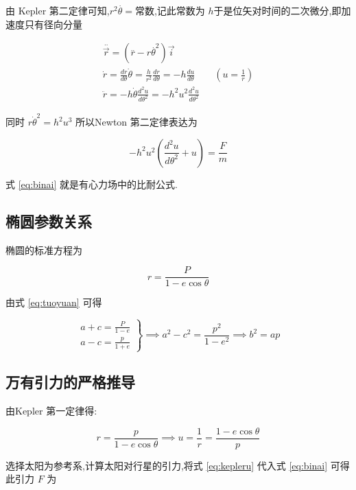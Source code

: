 由 Kepler 第二定律可知,$r^2\overset{.}{\theta}=\mbox{常数}$,记此常数为 $h$于是位矢对时间的二次微分,即加速度只有径向分量

\begin{gather}
  \overset{..}{\overrightarrow{r}}=(\overset{..}{r}-r\overset{.}{\theta}^2)\vec{i}
  \label{eq:rdd}\\
  \dot r =\frac{dr}{d\theta}\dot \theta =\frac{h}{r^2}\frac{dr}{d\theta}=-h\frac{du}{d\theta} \qquad (u=\frac{1}{r})\\
  \ddot r =-h\dot \theta \frac{d^2u}{d\theta^2}=-h^2u^2\frac{d^2u}{d\theta^2} 
\end{gather}

同时 $r{\dot \theta}^2=h^2u^3$ 所以Newton 第二定律表达为

\begin{equation}
  -h^2u^2(\frac{d^2u}{d\theta^2}+u)=\frac{F}{m}
  \label{eq:binai}
\end{equation}

式 \eqref{eq:binai} 就是有心力场中的比耐公式.

\subsection{椭圆参数关系}

椭圆的标准方程为

\begin{equation}
  r=\frac{P}{1-e\cos\theta}
  \label{eq:tuoyuan}
\end{equation}

由式 \eqref{eq:tuoyuan} 可得

\[ \left.
\begin{gathered}
  a+c=\frac{P}{1-e}  \\
  a-c=\frac{p}{1+e} 
\end{gathered}
\right\}
\implies 
  a^2-c^2=\frac{p^2}{1-e^2} 
\implies 
  b^2=ap
\]

\subsection{万有引力的严格推导}

由Kepler 第一定律得:

\begin{equation}
  r=\frac{p}{1-e\cos\theta}
  \implies
  u=\frac{1}{r}=\frac{1-e\cos\theta}{p}
  \label{eq:kepleru}
\end{equation}

选择太阳为参考系,计算太阳对行星的引力,将式 \eqref{eq:kepleru} 代入式 \eqref{eq:binai} 可得此引力 $F$ 为

